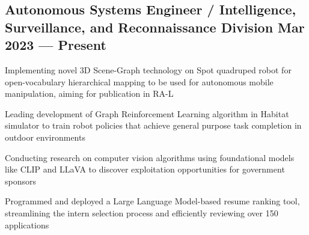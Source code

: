 \subsection{{Autonomous Systems Engineer / Intelligence, Surveillance, and Reconnaissance Division \hfill Mar 2023 --- Present}}
\begin{zitemize}
	\item Implementing novel 3D Scene-Graph technology on Spot quadruped robot for open-vocabulary hierarchical mapping to be used for autonomous mobile manipulation, aiming for publication in RA-L
	\item Leading development of Graph Reinforcement Learning algorithm in Habitat simulator to train robot policies that achieve general purpose task completion in outdoor environments
	\item Conducting research on computer vision algorithms using foundational models like CLIP and LLaVA to discover exploitation opportunities for government sponsors
	\item Programmed and deployed a Large Language Model-based resume ranking tool, streamlining the intern selection process and efficiently reviewing over 150 applications

\end{zitemize}

